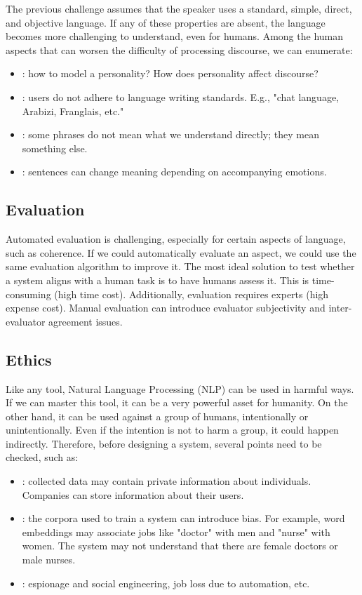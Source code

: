 \documentclass{KBook}
\begin{document}
The previous challenge assumes that the speaker uses a standard, simple, direct, and objective language. If any of these properties are absent, the language becomes more challenging to understand, even for humans. Among the human aspects that can worsen the difficulty of processing discourse, we can enumerate:

\begin{itemize}
	\item {}: how to model a personality? How does personality affect discourse?
	\item {}: users do not adhere to language writing standards. E.g., "chat language, Arabizi, Franglais, etc."
	\item {}: some phrases do not mean what we understand directly; they mean something else.
	\item {}: sentences can change meaning depending on accompanying emotions.
\end{itemize}


\subsection{Evaluation}

Automated evaluation is challenging, especially for certain aspects of language, such as coherence. If we could automatically evaluate an aspect, we could use the same evaluation algorithm to improve it. The most ideal solution to test whether a system aligns with a human task is to have humans assess it. This is time-consuming (high time cost). Additionally, evaluation requires experts (high expense cost). Manual evaluation can introduce evaluator subjectivity and inter-evaluator agreement issues.

\subsection{Ethics}

Like any tool, Natural Language Processing (NLP) can be used in harmful ways. If we can master this tool, it can be a very powerful asset for humanity. On the other hand, it can be used against a group of humans, intentionally or unintentionally. Even if the intention is not to harm a group, it could happen indirectly. Therefore, before designing a system, several points need to be checked, such as:

\begin{itemize}
	\item {}: collected data may contain private information about individuals. Companies can store information about their users.
	\item {}: the corpora used to train a system can introduce bias. For example, word embeddings may associate jobs like "doctor" with men and "nurse" with women. The system may not understand that there are female doctors or male nurses.
	\item {}: espionage and social engineering, job loss due to automation, etc.
\end{itemize}
\end{document}
